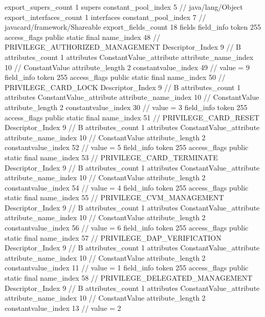 {{{			export_supers_count	1
			supers {
				constant_pool_index	5		// java/lang/Object
			}
			export_interfaces_count	1
			interfaces {
				constant_pool_index	7		// javacard/framework/Shareable
			}
			export_fields_count	18
			fields {
			field_info {
				token	255
				access_flags	public static final
				name_index	48		// PRIVILEGE_AUTHORIZED_MANAGEMENT
				Descriptor_Index	9		// B
				attributes_count	1
				attributes {
				ConstantValue_attribute {
					attribute_name_index	10		// ConstantValue
					attribute_length	2
					constantvalue_index	49		// value = 9
				}
				}
			}
			field_info {
				token	255
				access_flags	public static final
				name_index	50		// PRIVILEGE_CARD_LOCK
				Descriptor_Index	9		// B
				attributes_count	1
				attributes {
				ConstantValue_attribute {
					attribute_name_index	10		// ConstantValue
					attribute_length	2
					constantvalue_index	30		// value = 3
				}
				}
			}
			field_info {
				token	255
				access_flags	public static final
				name_index	51		// PRIVILEGE_CARD_RESET
				Descriptor_Index	9		// B
				attributes_count	1
				attributes {
				ConstantValue_attribute {
					attribute_name_index	10		// ConstantValue
					attribute_length	2
					constantvalue_index	52		// value = 5
				}
				}
			}
			field_info {
				token	255
				access_flags	public static final
				name_index	53		// PRIVILEGE_CARD_TERMINATE
				Descriptor_Index	9		// B
				attributes_count	1
				attributes {
				ConstantValue_attribute {
					attribute_name_index	10		// ConstantValue
					attribute_length	2
					constantvalue_index	54		// value = 4
				}
				}
			}
			field_info {
				token	255
				access_flags	public static final
				name_index	55		// PRIVILEGE_CVM_MANAGEMENT
				Descriptor_Index	9		// B
				attributes_count	1
				attributes {
				ConstantValue_attribute {
					attribute_name_index	10		// ConstantValue
					attribute_length	2
					constantvalue_index	56		// value = 6
				}
				}
			}
			field_info {
				token	255
				access_flags	public static final
				name_index	57		// PRIVILEGE_DAP_VERIFICATION
				Descriptor_Index	9		// B
				attributes_count	1
				attributes {
				ConstantValue_attribute {
					attribute_name_index	10		// ConstantValue
					attribute_length	2
					constantvalue_index	11		// value = 1
				}
				}
			}
			field_info {
				token	255
				access_flags	public static final
				name_index	58		// PRIVILEGE_DELEGATED_MANAGEMENT
				Descriptor_Index	9		// B
				attributes_count	1
				attributes {
				ConstantValue_attribute {
					attribute_name_index	10		// ConstantValue
					attribute_length	2
					constantvalue_index	13		// value = 2
}}}}}}}

